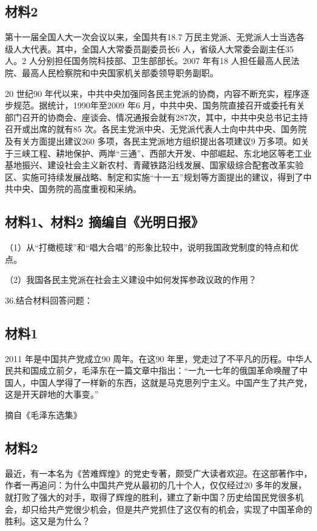 \documentclass[UTF8,11pt]{ctexart}
\begin{document}
\subsection*{材料2}

第十一届全国人大一次会议以来，全国共有18.7 万民主党派、无党派人士当选各级人大代表。其中，全国人大常委员副委员长6 人，省级人大常委会副主任35 人。2 人分别担任国务院科技部、卫生部部长。2007 年有18 人担任最高人民法院、最高人民检察院和中央国家机关部委领导职务副职。

20 世纪90 年代以来，中共中央加强同各民主党派的协商，内容不断充实，程序逐步规范。据统计，1990年至2009 年6 月，中共中央、国务院直接召开或委托有关部门召开的协商会、座谈会、情况通报会就有287次，其中，中共中央总书记主持召开或出席的就有85 次。各民主党派中央、无党派代表人士向中共中央、国务院及有关方面提出建议260 多项，各民主党派地方组织提出各项建议9 万多项。如关于三峡工程、耕地保护、两岸“三通”、西部大开发、中部崛起、东北地区等老工业基地振兴、建设社会主义新农村、青藏铁路沿线发展、国家级综合配套改革实验区、实施可持续发展战略、制定和实施“十一五”规划等方面提出的建议，得到了中共中央、国务院的高度重视和采纳。

\subsection*{材料1、材料2 摘编自《光明日报》}

（1）从“打橄榄球”和“唱大合唱”的形象比较中，说明我国政党制度的特点和优点。


（2）我国各民主党派在社会主义建设中如何发挥参政议政的作用？


36.结合材料回答问题：


\subsection*{材料1}

2011 年是中国共产党成立90 周年。在这90 年里，党走过了不平凡的历程。中华人民共和国成立前夕，毛泽东在一篇文章中指出：“一九一七年的俄国革命唤醒了中国人，中国人学得了一样新的东西，这就是马克思列宁主义。中国产生了共产党，这是开天辟地的大事变。”

摘自《毛泽东选集》

\subsection*{材料2}

最近，有一本名为《苦难辉煌》的党史专著，颇受广大读者欢迎。在这部著作中，作者一再追问：为什么中国共产党从最初的几十个人，仅仅经过20 多年的发展，就打败了强大的对手，取得了辉煌的胜利，建立了新中国？历史给国民党很多机会，却只给共产党很少机会，但是共产党抓住了这仅有的机会，实现了中国革命的胜利。这又是为什么？
\end{document}
